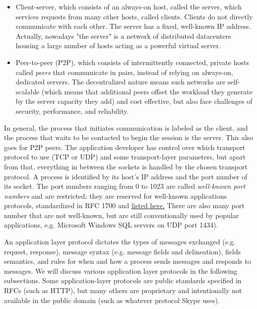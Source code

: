 \documentclass[8pt, table, xcdraw]{article}%
\begin{document}
\begin{itemize}
    \item Client-server, which consists of an always-on host, called the server, which services requests from many other hosts, called clients. Clients do not directly communicate with each other. The server has a fixed, well-known IP address. Actually, nowadays "the server" is a network of distributed datacenters housing a large number of hosts acting as a powerful virtual server.
    \item Peer-to-peer (P2P), which consists of intermittently connected, private hosts called \emph{peers} that communicate in pairs, instead of relying on always-on, dedicated servers. The decentralized nature means such networks are self-scalable (which means that additional peers offset the workload they generate by the server capacity they add) and cost effective, but also face challenges of security, performance, and reliability.
\end{itemize}

In general, the process that initiates communication is labeled as the client, and the process that waits to be contacted to begin the session is the server. This also goes for P2P peers. The application developer has control over which transport protocol to use (TCP or UDP) and some transport-layer parameters, but apart from that, everything in between the sockets is handled by the chosen transport protocol. A process is identified by its host's IP address and the port number of its socket. The port numbers ranging from 0 to 1023 are called \emph{well-known port numbers}
and are restricted; they are reserved for well-known applications protocols, standardized in RFC 1700 and \href{https://en.wikipedia.org/wiki/List_of_TCP_and_UDP_port_numbers}{listed here.} There are also many port number that are not well-known, but are still conventionally used by popular applications, e.g. Microsoft Windows SQL servers on UDP port 1434).

An application layer protocol dictates the types of messages exchanged (e.g. request, response), message syntax (e.g. message fields and delineation), fields semantics, and rules for when and how a process sends messages and responds to messages. We will discuss various application layer protocols in the following subsections. Some application-layer protocols are public standards specified in RFCs (such as HTTP), but many others are proprietary and intentionally not available in the public domain (such as whatever protocol Skype uses).
\end{document}
